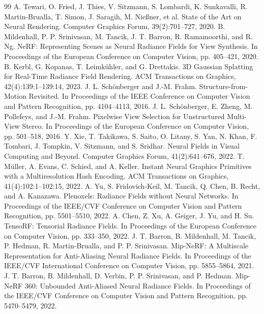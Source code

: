 \documentclass[a4paper, 12pt, centering]{article}
\begin{document}
\begin{thebibliography}{99}
 A. Tewari, O. Fried, J. Thies, V. Sitzmann, S. Lombardi, K. Sunkavalli, R. Martin-Brualla, T. Simon, J. Saragih, M. Nie{\ss}ner, et al. State of the Art on Neural Rendering. Computer Graphics Forum, 39(2):701--727, 2020.
 B. Mildenhall, P. P. Srinivasan, M. Tancik, J. T. Barron, R. Ramamoorthi, and R. Ng. NeRF: Representing Scenes as Neural Radiance Fields for View Synthesis. In Proceedings of the European Conference on Computer Vision, pp. 405--421, 2020.
 B. Kerbl, G. Kopanas, T. Leimk{\"u}hler, and G. Drettakis. 3D Gaussian Splatting for Real-Time Radiance Field Rendering. ACM Transactions on Graphics, 42(4):139:1--139:14, 2023.
 J. L. Sch{\"o}nberger and J.-M. Frahm. Structure-from-Motion Revisited. In Proceedings of the IEEE Conference on Computer Vision and Pattern Recognition, pp. 4104--4113, 2016.
 J. L. Sch{\"o}nberger, E. Zheng, M. Pollefeys, and J.-M. Frahm. Pixelwise View Selection for Unstructured Multi-View Stereo. In Proceedings of the European Conference on Computer Vision, pp. 501--518, 2016.
 Y. Xie, T. Takikawa, S. Saito, O. Litany, S. Yan, N. Khan, F. Tombari, J. Tompkin, V. Sitzmann, and S. Sridhar. Neural Fields in Visual Computing and Beyond. Computer Graphics Forum, 41(2):641--676, 2022.
 T. M{\"u}ller, A. Evans, C. Schied, and A. Keller. Instant Neural Graphics Primitives with a Multiresolution Hash Encoding. ACM Transactions on Graphics, 41(4):102:1--102:15, 2022.
 A. Yu, S. Fridovich-Keil, M. Tancik, Q. Chen, B. Recht, and A. Kanazawa. Plenoxels: Radiance Fields without Neural Networks. In Proceedings of the IEEE/CVF Conference on Computer Vision and Pattern Recognition, pp. 5501--5510, 2022.
 A. Chen, Z. Xu, A. Geiger, J. Yu, and H. Su. TensoRF: Tensorial Radiance Fields. In Proceedings of the European Conference on Computer Vision, pp. 333--350, 2022.
 J. T. Barron, B. Mildenhall, M. Tancik, P. Hedman, R. Martin-Brualla, and P. P. Srinivasan. Mip-NeRF: A Multiscale Representation for Anti-Aliasing Neural Radiance Fields. In Proceedings of the IEEE/CVF International Conference on Computer Vision, pp. 5855--5864, 2021.
 J. T. Barron, B. Mildenhall, D. Verbin, P. P. Srinivasan, and P. Hedman. Mip-NeRF 360: Unbounded Anti-Aliased Neural Radiance Fields. In Proceedings of the IEEE/CVF Conference on Computer Vision and Pattern Recognition, pp. 5470--5479, 2022.

\end{thebibliography}
\end{document}
